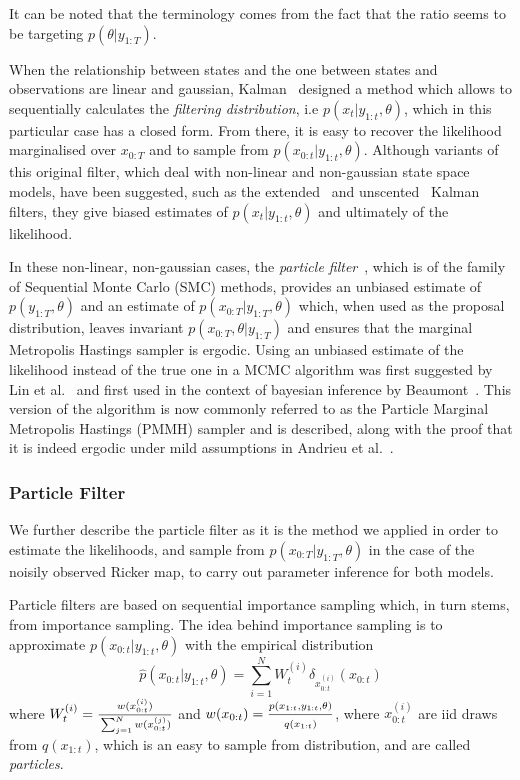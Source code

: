 \documentclass[12pt]{article}
\begin{document}
	It can be noted that the terminology comes from the fact that the ratio seems to be targeting $p(\theta | y_{1:T})$.
	
 	When the relationship between states and the one between states and observations are linear and gaussian, Kalman~\cite{Kalman1960} designed a method which allows to sequentially calculates the \emph{filtering distribution}, i.e $p(x_{t}| y_{1:t}, \theta)$, which in this particular case has a closed form. From there, it is easy to recover the likelihood marginalised over $x_{0:T}$ and to sample from $p(x_{0:t}| y_{1:t}, \theta)$. Although variants of this original filter, which deal with non-linear and non-gaussian state space models, have been suggested, such as the extended~\cite{McElhoe1966} and unscented~\cite{Julier1997} Kalman filters, they give biased estimates of $p(x_t|y_{1:t}, \theta)$ and ultimately of the likelihood. 
 	
 	In these non-linear, non-gaussian cases, the \emph{particle filter}~\cite{Gordon1993}, which is of the family of Sequential Monte Carlo (SMC) methods, provides an unbiased estimate of $p(y_{1:T}, \theta)$ and an estimate of $p(x_{0:T}|y_{1:T}, \theta)$ which, when used as the proposal distribution, leaves invariant $p(x_{0:T}, \theta|y_{1:T})$ and ensures that the marginal Metropolis Hastings sampler is ergodic. Using an unbiased estimate of the likelihood instead of the true one in a MCMC algorithm was first suggested by Lin et al.~\cite{lin2000noisy} and first used in the context of bayesian inference by Beaumont~\cite{beaumont2003estimation}. This version of the algorithm is now commonly referred to as the Particle Marginal Metropolis Hastings (PMMH) sampler and is described, along with the proof that it is indeed ergodic under mild assumptions in Andrieu et al.~\cite{andrieu2010particle}.
	
	\subsubsection{Particle Filter}
	We further describe the particle filter as it is the method we applied in order to estimate the likelihoods, and sample from $p(x_{0:T}|y_{1:T}, \theta)$ in the case of the noisily observed Ricker map, to carry out parameter inference for both models.
	
	Particle filters are based on sequential importance sampling which, in turn stems, from importance sampling.
	The idea behind importance sampling is to approximate $p(x_{0:t}|y_{1:t}, \theta)$ with the empirical distribution
	\begin{equation}
	\hat{p}(x_{0:t}|y_{1:t}, \theta) = \sum_{i=1}^{N}W_t^{(i)} \delta_{x_{0:t}^{(i)}}(x_{0:t})
	\end{equation}
	where $W_t^{(i)} = \frac{\strut w(x_{0:t}^{(i)})}{\strut \sum_{j=1}^{N} w(x_{0:t}^{(j)})}$ and $w(x_{0:t}) = \frac{\strut p(x_{1:t},y_{1:t}, \theta)}{\strut q(x_{1:t})}$, where $x_{0:t}^{(i)}$ are iid draws from $q(x_{1:t})$, which is an easy to sample from distribution, and are called \emph{particles}.
	
\end{document}
